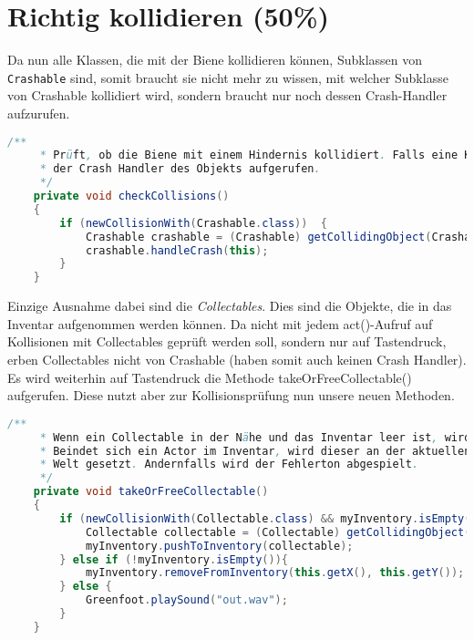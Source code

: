 \documentclass{pi1}
\begin{document}
\section{Richtig kollidieren (50\%)}

Da nun alle Klassen, die mit der Biene kollidieren können, Subklassen von \texttt{Crashable} sind, somit braucht sie nicht mehr zu wissen, mit welcher Subklasse von Crashable kollidiert wird, sondern braucht nur noch dessen Crash-Handler aufzurufen.

\begin{lstlisting}[caption={\emph{checkCollisions()}-Methode}, firstnumber=156, language=Java]
/**
     * Prüft, ob die Biene mit einem Hindernis kollidiert. Falls eine Kollision existiert, wird
     * der Crash Handler des Objekts aufgerufen.
     */
    private void checkCollisions()
    {
        if (newCollisionWith(Crashable.class))  {
            Crashable crashable = (Crashable) getCollidingObject(Crashable.class);
            crashable.handleCrash(this);
        }
    }
\end{lstlisting}

Einzige Ausnahme dabei sind die \emph{Collectables}. Dies sind die Objekte, die in das Inventar aufgenommen werden können. Da nicht mit jedem act()-Aufruf auf Kollisionen mit Collectables geprüft werden soll, sondern nur auf Tastendruck, erben Collectables nicht von Crashable (haben somit auch keinen Crash Handler). Es wird weiterhin auf Tastendruck die Methode takeOrFreeCollectable() aufgerufen. Diese nutzt aber zur Kollisionsprüfung nun unsere neuen Methoden.

\begin{lstlisting}[caption={\emph{takeOrFreeCollectable()}-Methode}, firstnumber=168, language=Java]
/**
     * Wenn ein Collectable in der Nähe und das Inventar leer ist, wird das Collectable eingesammelt.
     * Beindet sich ein Actor im Inventar, wird dieser an der aktuellen Position der Biene in die
     * Welt gesetzt. Andernfalls wird der Fehlerton abgespielt.
     */
    private void takeOrFreeCollectable()
    {
        if (newCollisionWith(Collectable.class) && myInventory.isEmpty() ){
            Collectable collectable = (Collectable) getCollidingObject(Collectable.class);
            myInventory.pushToInventory(collectable);
        } else if (!myInventory.isEmpty()){
            myInventory.removeFromInventory(this.getX(), this.getY());
        } else {
            Greenfoot.playSound("out.wav");
        }
    }
\end{lstlisting}
\end{document}

